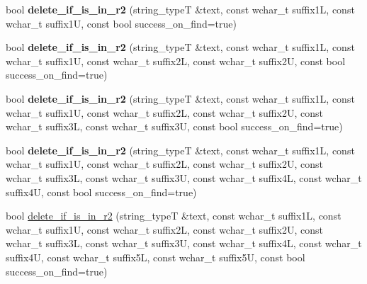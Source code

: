 \begin{DoxyCompactItemize}
\item 
\hypertarget{group___stemming_ga722e75e6404934da2f0c9c00ffded48a}{bool {\bfseries delete\-\_\-if\-\_\-is\-\_\-in\-\_\-r2} (string\-\_\-type\-T \&text, const wchar\-\_\-t suffix1\-L, const wchar\-\_\-t suffix1\-U, const bool success\-\_\-on\-\_\-find=true)}\label{group___stemming_ga722e75e6404934da2f0c9c00ffded48a}

\item 
\hypertarget{group___stemming_ga33bf1854d1748ba97e30ad798f828b0e}{bool {\bfseries delete\-\_\-if\-\_\-is\-\_\-in\-\_\-r2} (string\-\_\-type\-T \&text, const wchar\-\_\-t suffix1\-L, const wchar\-\_\-t suffix1\-U, const wchar\-\_\-t suffix2\-L, const wchar\-\_\-t suffix2\-U, const bool success\-\_\-on\-\_\-find=true)}\label{group___stemming_ga33bf1854d1748ba97e30ad798f828b0e}

\item 
\hypertarget{group___stemming_gac78dd58f01ed17a41eedc33d5b2deedb}{bool {\bfseries delete\-\_\-if\-\_\-is\-\_\-in\-\_\-r2} (string\-\_\-type\-T \&text, const wchar\-\_\-t suffix1\-L, const wchar\-\_\-t suffix1\-U, const wchar\-\_\-t suffix2\-L, const wchar\-\_\-t suffix2\-U, const wchar\-\_\-t suffix3\-L, const wchar\-\_\-t suffix3\-U, const bool success\-\_\-on\-\_\-find=true)}\label{group___stemming_gac78dd58f01ed17a41eedc33d5b2deedb}

\item 
\hypertarget{group___stemming_ga3a79fd0ac96d009d0c93f1bec847c2ff}{bool {\bfseries delete\-\_\-if\-\_\-is\-\_\-in\-\_\-r2} (string\-\_\-type\-T \&text, const wchar\-\_\-t suffix1\-L, const wchar\-\_\-t suffix1\-U, const wchar\-\_\-t suffix2\-L, const wchar\-\_\-t suffix2\-U, const wchar\-\_\-t suffix3\-L, const wchar\-\_\-t suffix3\-U, const wchar\-\_\-t suffix4\-L, const wchar\-\_\-t suffix4\-U, const bool success\-\_\-on\-\_\-find=true)}\label{group___stemming_ga3a79fd0ac96d009d0c93f1bec847c2ff}

\item 
\hypertarget{group___stemming_ga222f7af1124d34e58b3c38fa4b2ee669}{bool \hyperlink{group___stemming_ga222f7af1124d34e58b3c38fa4b2ee669}{delete\-\_\-if\-\_\-is\-\_\-in\-\_\-r2} (string\-\_\-type\-T \&text, const wchar\-\_\-t suffix1\-L, const wchar\-\_\-t suffix1\-U, const wchar\-\_\-t suffix2\-L, const wchar\-\_\-t suffix2\-U, const wchar\-\_\-t suffix3\-L, const wchar\-\_\-t suffix3\-U, const wchar\-\_\-t suffix4\-L, const wchar\-\_\-t suffix4\-U, const wchar\-\_\-t suffix5\-L, const wchar\-\_\-t suffix5\-U, const bool success\-\_\-on\-\_\-find=true)}\label{group___stemming_ga222f7af1124d34e58b3c38fa4b2ee669}


\end{DoxyCompactItemize}
